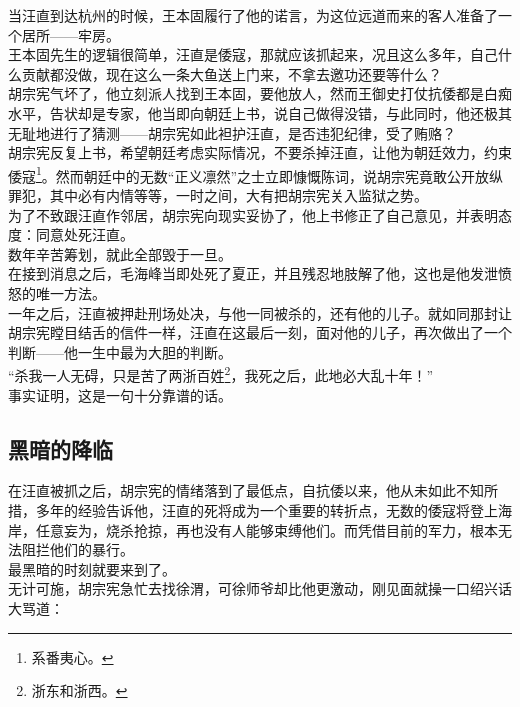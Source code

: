 \begin{multicols}{\theparacolNo}
当汪直到达杭州的时候，王本固履行了他的诺言，为这位远道而来的客人准备了一个居所——牢房。\\

王本固先生的逻辑很简单，汪直是倭寇，那就应该抓起来，况且这么多年，自己什么贡献都没做，现在这么一条大鱼送上门来，不拿去邀功还要等什么？\\

胡宗宪气坏了，他立刻派人找到王本固，要他放人，然而王御史打仗抗倭都是白痴水平，告状却是专家，他当即向朝廷上书，说自己做得没错，与此同时，他还极其无耻地进行了猜测——胡宗宪如此袒护汪直，是否违犯纪律，受了贿赂？\\

胡宗宪反复上书，希望朝廷考虑实际情况，不要杀掉汪直，让他为朝廷效力，约束倭寇\footnote{系番夷心。}。然而朝廷中的无数“正义凛然”之士立即慷慨陈词，说胡宗宪竟敢公开放纵罪犯，其中必有内情等等，一时之间，大有把胡宗宪关入监狱之势。\\

为了不致跟汪直作邻居，胡宗宪向现实妥协了，他上书修正了自己意见，并表明态度：同意处死汪直。\\

数年辛苦筹划，就此全部毁于一旦。\\

在接到消息之后，毛海峰当即处死了夏正，并且残忍地肢解了他，这也是他发泄愤怒的唯一方法。\\

一年之后，汪直被押赴刑场处决，与他一同被杀的，还有他的儿子。就如同那封让胡宗宪瞠目结舌的信件一样，汪直在这最后一刻，面对他的儿子，再次做出了一个判断——他一生中最为大胆的判断。\\

“杀我一人无碍，只是苦了两浙百姓\footnote{浙东和浙西。}，我死之后，此地必大乱十年！”\\

事实证明，这是一句十分靠谱的话。\\

\subsection{黑暗的降临}
在汪直被抓之后，胡宗宪的情绪落到了最低点，自抗倭以来，他从未如此不知所措，多年的经验告诉他，汪直的死将成为一个重要的转折点，无数的倭寇将登上海岸，任意妄为，烧杀抢掠，再也没有人能够束缚他们。而凭借目前的军力，根本无法阻拦他们的暴行。\\

最黑暗的时刻就要来到了。\\

无计可施，胡宗宪急忙去找徐渭，可徐师爷却比他更激动，刚见面就操一口绍兴话大骂道：\\


\end{multicols}
